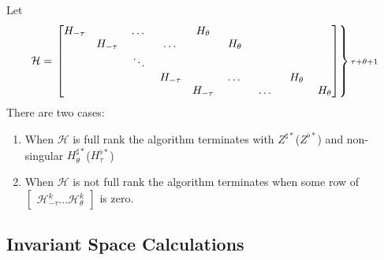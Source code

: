 \documentclass[12pt]{article}
\begin{document}
{\color{anewcolor}
\begin{thrm}
Let 
{\small
\begin{gather*} \mathcal{H}=\left .
  \begin{bmatrix}
H_{-\tau}&\hspace{0.25in}&\dots&\hspace{0.25in}&H_{\theta}\\
&H_{-\tau}&\hspace{0.25in}&\dots&\hspace{0.25in}&H_{\theta}\\
&&\ddots\\
&&&H_{-\tau}&\hspace{0.25in}&\dots&\hspace{0.25in}&H_{\theta}\\
&&&&H_{-\tau}&\hspace{0.25in}&\dots&\hspace{0.25in}&H_{\theta}\\
  \end{bmatrix} \right \} \text{${\scriptstyle\tau+\theta+1}$} 
\end{gather*}}
There are two cases:
\begin{enumerate}
\item When $\mathcal{H}$ is full rank the algorithm terminates with 
 $Z^{\sharp\ast}$($Z^{\flat\ast}$) and non-singular
 $H^{\sharp\ast}_{\theta}$($H^{\flat\ast}_{\tau}$)
\item When $\mathcal{H}$ is not full rank the algorithm terminates when
some row of $
\begin{bmatrix}
\mathcal{H}^k_{-\tau}\ldots\mathcal{H}^k_\theta 
\end{bmatrix}$ is zero.
\end{enumerate}

\end{thrm}
}




\subsection{Invariant Space Calculations}
\label{sec:invariantSpace}
\end{document}
